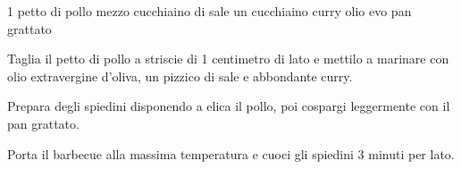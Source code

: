 \begin{ingreds}
	1 petto di pollo
	mezzo cucchiaino di sale
	un cucchiaino curry
	olio evo
	pan grattato
\end{ingreds}

\begin{method}
Taglia il petto di pollo a striscie di 1 centimetro di lato e mettilo a marinare con olio extravergine d'oliva, un pizzico di sale e abbondante curry.

Prepara degli spiedini disponendo a elica il pollo, poi cospargi leggermente con il pan grattato.

Porta il barbecue alla massima temperatura e cuoci gli spiedini 3 minuti per lato.
\end {method}
